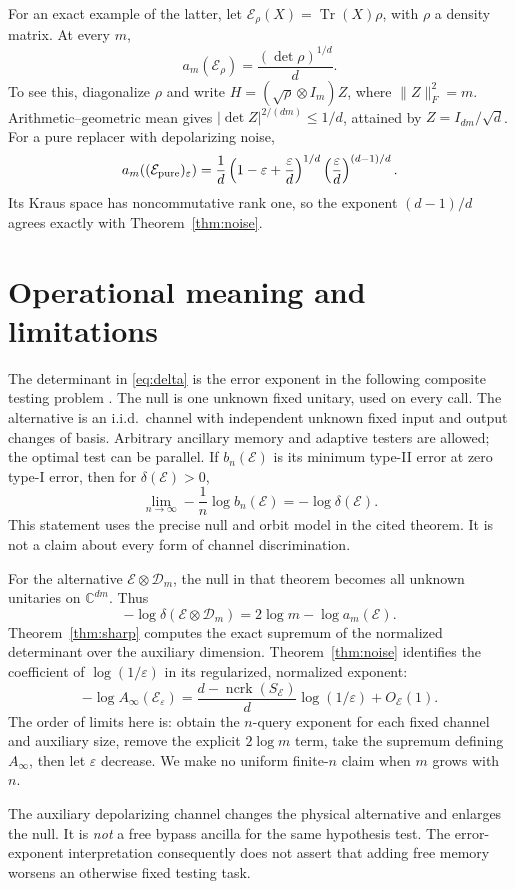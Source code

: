 \documentclass[11pt,a4paper]{article}
\theoremstyle{remark}\newtheorem{remark}[theorem]{Remark}
\newcommand{\Tr}{\operatorname{Tr}}
\newcommand{\ncrk}{\operatorname{ncrk}}
\newcommand{\D}{\mathcal D}
\newcommand{\E}{\mathcal E}
\newcommand{\Ainf}{A_\infty}
\begin{document}
For an exact example of the latter, let \(\E_\rho(X)=\Tr(X)\rho\), with \(\rho\) a density matrix. At every \(m\),
\begin{equation}\label{eq:replacer}
 a_m(\E_\rho)=\frac{(\det\rho)^{1/d}}d.
\end{equation}
To see this, diagonalize \(\rho\) and write
\(H=(\sqrt\rho\otimes I_m)Z\), where
\(\|Z\|_F^2=m\). Arithmetic--geometric mean gives
\(|\det Z|^{2/(dm)}\le1/d\), attained by \(Z=I_{dm}/\sqrt d\).
For a pure replacer with depolarizing noise,
\[
 a_m((\E_{\rm pure})_\varepsilon)
 =\frac1d\left(1-\varepsilon+\frac\varepsilon d\right)^{1/d}
          \left(\frac\varepsilon d\right)^{(d-1)/d}.
\]
Its Kraus space has noncommutative rank one, so the exponent \((d-1)/d\) agrees exactly with Theorem~\ref{thm:noise}.

\section{Operational meaning and limitations}
The determinant in \eqref{eq:delta} is the error exponent in the following composite testing problem \cite{previous}. The null is one unknown fixed unitary, used on every call. The alternative is an i.i.d.\ channel with independent unknown fixed input and output changes of basis. Arbitrary ancillary memory and adaptive testers are allowed; the optimal test can be parallel. If \(b_n(\E)\) is its minimum type-II error at zero type-I error, then for \(\delta(\E)>0\),
\[
 \lim_{n\to\infty}-\frac1n\log b_n(\E)=-\log\delta(\E).
\]
This statement uses the precise null and orbit model in the cited theorem. It is not a claim about every form of channel discrimination.

For the alternative \(\E\otimes\D_m\), the null in that theorem becomes all unknown unitaries on \(\mathbb C^{dm}\). Thus
\[
 -\log\delta(\E\otimes\D_m)
 =2\log m-\log a_m(\E).
\]
Theorem~\ref{thm:sharp} computes the exact supremum of the normalized determinant over the auxiliary dimension. Theorem~\ref{thm:noise} identifies the coefficient of \(\log(1/\varepsilon)\) in its regularized, normalized exponent:
\[
 -\log\Ainf(\E_\varepsilon)
 =\frac{d-\ncrk(S_\E)}d\log(1/\varepsilon)+O_\E(1).
\]
The order of limits here is: obtain the \(n\)-query exponent for each fixed channel and auxiliary size, remove the explicit \(2\log m\) term, take the supremum defining \(\Ainf\), then let \(\varepsilon\) decrease. We make no uniform finite-\(n\) claim when \(m\) grows with \(n\).

The auxiliary depolarizing channel changes the physical alternative and enlarges the null. It is \emph{not} a free bypass ancilla for the same hypothesis test. The error-exponent interpretation consequently does not assert that adding free memory worsens an otherwise fixed testing task.
\end{document}
